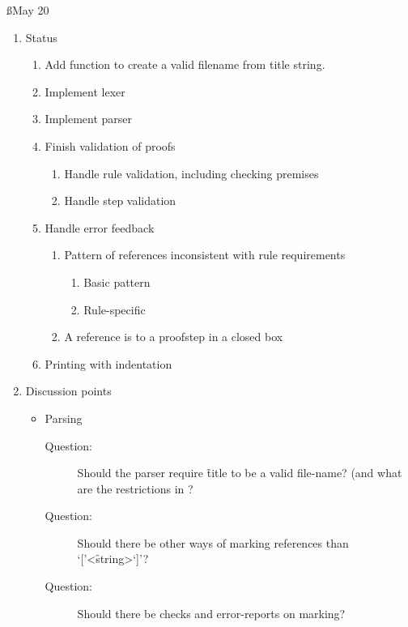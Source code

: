 \documentclass[a4paper]{article}
\begin{document}
\ss{May 20}
\begin{enumerate}
  \item Status
    \begin{enumerate}[\HollowBox]
      \item Add function to create a valid filename from title 
      string.
      \item Implement lexer
      \item Implement parser
      \item[\Checkedbox] Finish validation of proofs
        \begin{enumerate}[\HollowBox]
          \item[\Checkedbox] Handle rule validation, including checking 
          premises
          \item[\Checkedbox] Handle step validation
        \end{enumerate}
      \item[\Checkedbox] Handle error feedback
        \begin{enumerate}[\HollowBox]
          \item[\Checkedbox] Pattern of references inconsistent with rule 
          requirements
            \begin{enumerate}[\HollowBox]
              \item[\Checkedbox] Basic pattern
              \item[\Checkedbox] Rule-specific
            \end{enumerate}
          \item[\Checkedbox] A reference is to a proofstep in a closed box
        \end{enumerate}
      \item[\Checkedbox] Printing with indentation
    \end{enumerate}
  \item Discussion points
    \begin{itemize}
      \item Parsing
        \begin{description}
          \item[Question:] Should the parser require \f{title} to be a
          valid file-name? (and what are the restrictions in ?
          \item[Question:] Should there be other ways of marking references
          than `['<\f{string}>`]'? 
          \item[Question:] Should there be checks and error-reports on
          marking?
        \end{description}

\end{itemize}
\end{enumerate}
\end{document}
